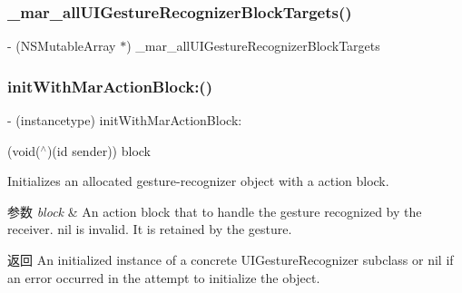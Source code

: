 \subsubsection{\texorpdfstring{\+\_\+mar\+\_\+all\+U\+I\+Gesture\+Recognizer\+Block\+Targets()}{\_mar\_allUIGestureRecognizerBlockTargets()}}
{\footnotesize\ttfamily -\/ (N\+S\+Mutable\+Array $\ast$) \+\_\+mar\+\_\+all\+U\+I\+Gesture\+Recognizer\+Block\+Targets \begin{DoxyParamCaption}{ }\end{DoxyParamCaption}\hspace{0.3cm}{\ttfamily [implementation]}}

\mbox{\label{category_u_i_gesture_recognizer_07_m_a_r_e_x_08_adbbf5deead95cf3afe6c88c693efbe33}} 
\subsubsection{\texorpdfstring{init\+With\+Mar\+Action\+Block\+:()}{initWithMarActionBlock:()}}
{\footnotesize\ttfamily -\/ (instancetype) init\+With\+Mar\+Action\+Block\+: \begin{DoxyParamCaption}\item[{(void($^\wedge$)(id sender))}]{block }\end{DoxyParamCaption}}

Initializes an allocated gesture-\/recognizer object with a action block.


\begin{DoxyParams}{参数}
{\em block} & An action block that to handle the gesture recognized by the receiver. nil is invalid. It is retained by the gesture.\\
\hline
\end{DoxyParams}
\begin{DoxyReturn}{返回}
An initialized instance of a concrete U\+I\+Gesture\+Recognizer subclass or nil if an error occurred in the attempt to initialize the object. 
\end{DoxyReturn}
\mbox{\label{category_u_i_gesture_recognizer_07_m_a_r_e_x_08_a950044b3d39a1c6e771e124c6d435aac}} 
